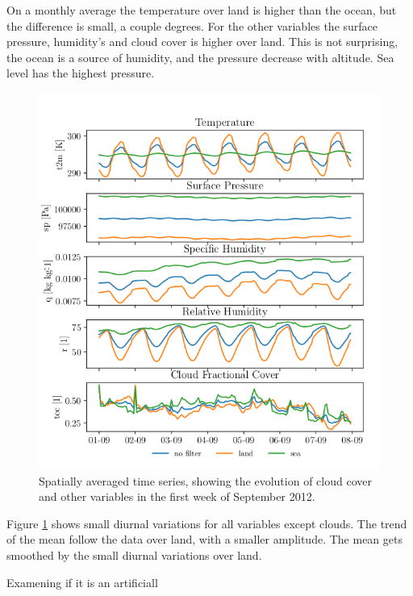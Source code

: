 On a monthly average the temperature over land is higher than the ocean, but the difference is small, a couple degrees. For the other variables the surface pressure, humidity's and cloud cover is higher over land. This is not surprising, the ocean is a source of humidity, and the pressure decrease with altitude. Sea level has the highest pressure. 

\begin{figure}[ht]
    \centering
    \includegraphics{python_figs/spatially_averaged_one_week_from_2012-09-01.png}
    \caption{Spatially averaged time series, showing the evolution of cloud cover and other variables in the first week of September 2012.}
    \label{fig:first_week_sep_2012}
\end{figure}
Figure \ref{fig:first_week_sep_2012} shows small diurnal variations for all variables except clouds. The trend of the mean follow the data over land, with a smaller amplitude. The mean gets smoothed by the small diurnal variations over land. 

Examening if it is an artificiall 


